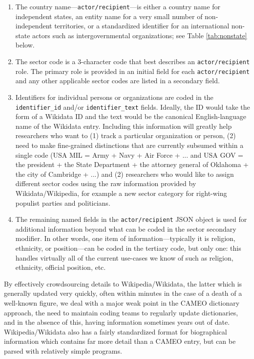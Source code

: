 \documentclass[11pt]{report}
\newcommand{\txt}[1]{\texttt{#1}}
\begin{document}
\begin{enumerate}
\item The country name---\texttt{actor/recipient}---is either a country name for independent states, an entity name for a very small number of non-independent territories, or a standardized identifier for an international non-state actors such as intergovernmental organizations; see Table \ref{tab:nonstate} below.
\item The sector code is a 3-character code that best describes an \texttt{actor/recipient} role. The primary role is provided in an initial field for each \texttt{actor/recipient}  and any other applicable sector codes are listed in a secondary field.
\item Identifiers for individual persons or organizations are coded in the \texttt{identifier\_id} and/or \texttt{identifier\_text} fields. Ideally, the ID would take the form of a Wikidata ID and the text would be the canonical English-language name of the Wikidata entry. Including this information will greatly help researchers who want to (1) track a particular organization or person, (2) need to make fine-grained distinctions that are currently subsumed within a single code (USA MIL = Army + Navy + Air Force + ... and USA GOV = the president + the State Department + the attorney general of Oklahoma + the city of Cambridge + ...) and (2) researchers who would like to assign different sector codes using the raw information provided by Wikidata/Wikipedia, for example a new sector category for right-wing populist parties and politicians.
\item The remaining named fields in the \txt{actor/recipient} JSON object is used for additional information beyond what can be coded in the sector secondary modifier. In other words, one item of information---typically it is religion, ethnicity, or position---can be coded in the tertiary code, but only one: this handles virtually all of the current use-cases we know of such as religion, ethnicity, official position, etc.
\end{enumerate}

By effectively crowdsourcing details to Wikipedia/Wikidata, the latter which is generally updated very quickly, often within minutes in the case of a death of a well-known figure, we deal with a major weak point in the CAMEO dictionary approach,  the need to maintain coding teams to regularly update dictionaries, and in the absence of this, having information sometimes years out of date. Wikipedia/Wikidata also has a fairly standardized format for biographical information which contains far more detail than a CAMEO entry, but can be parsed with relatively simple programs.
\end{document}
